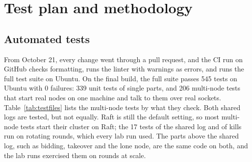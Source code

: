\section{Test plan and methodology}
\label{sec:testing}

\subsection{Automated tests}
\label{sec:tests}

From October 21, every change went through a pull request, and the CI run on GitHub checks formatting, runs the linter with warnings as errors, and runs the full test suite on Ubuntu. On the final build, the full suite passes 545 tests on Ubuntu with 0 failures: 339 unit tests of single parts, and 206 multi-node tests that start real nodes on one machine and talk to them over real sockets. Table~\ref{tab:testfiles} lists the multi-node tests by what they check. Both shared logs are tested, but not equally. Raft is still the default setting, so most multi-node tests start their cluster on Raft; the 17 tests of the shared log and of kills run on rotating rounds, which every lab run used. The parts above the shared log, such as bidding, takeover and the lone node, are the same code on both, and the lab runs exercised them on rounds at scale.

